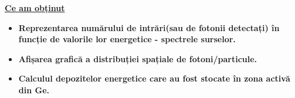 \documentclass[10pt]{beamer}
\begin{document}
\begin{frame}{\textbf{\underline{Ce am obținut}}}

\begin{itemize}

\vspace{-3cm}
   \item  \textbf{Reprezentarea numărului de intrări(sau de fotonii detectați) în funcție de valorile lor energetice - spectrele surselor.}\\
   \item \textbf{Afișarea grafică a distribuției spațiale de fotoni/particule.}\\
   \item \textbf{Calculul depozitelor energetice care au fost stocate în zona activă din Ge.}

\end{itemize}



\end{frame}
\end{document}
